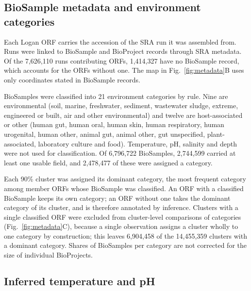 \documentclass[pdflatex,sn-nature,iicol]{sn-jnl}%
\begin{document}
\subsection{BioSample metadata and environment categories}

Each Logan ORF carries the accession of the SRA run it was assembled from. Runs were linked to BioSample and BioProject records through SRA metadata. Of the 7,626,110 runs contributing ORFs, 1,414,327 have no BioSample record, which accounts for the ORFs without one. The map in Fig.~\ref{fig:metadata}B uses only coordinates stated in BioSample records. %

BioSamples were classified into 21 environment categories by rule. Nine are environmental (soil, marine, freshwater, sediment, wastewater sludge, extreme, engineered or built, air and other environmental) and twelve are host-associated or other (human gut, human oral, human skin, human respiratory, human urogenital, human other, animal gut, animal other, gut unspecified, plant-associated, laboratory culture and food). Temperature, pH, salinity and depth were not used for classification. Of 6,796,722 BioSamples, 2,744,599 carried at least one usable field, and 2,478,477 of these were assigned a category.

Each 90\% cluster was assigned its dominant category, the most frequent category among member ORFs whose BioSample was classified. An ORF with a classified BioSample keeps its own category; an ORF without one takes the dominant category of its cluster, and is therefore annotated by inference. Clusters with a single classified ORF were excluded from cluster-level comparisons of categories (Fig.~\ref{fig:metadata}C), because a single observation assigns a cluster wholly to one category by construction; this leaves 6,904,458 of the 14,455,359 clusters with a dominant category. Shares of BioSamples per category are not corrected for the size of individual BioProjects. %

\subsection{Inferred temperature and pH}
\end{document}
